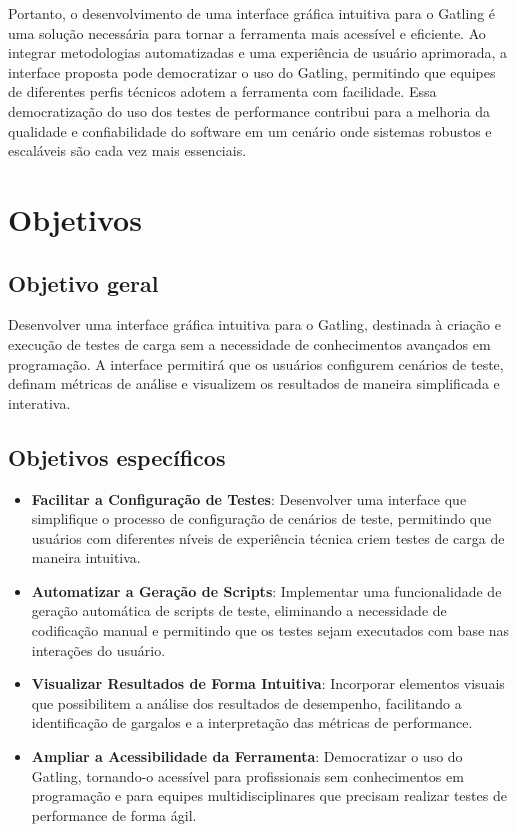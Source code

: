 \documentclass[
	12pt,
	openright,
	twoside,
	a4paper,
	english,
	brazil
	]{abntex2}
\begin{document}
Portanto, o desenvolvimento de uma interface gráfica intuitiva para o Gatling é uma solução necessária para tornar a ferramenta mais acessível e eficiente. Ao integrar metodologias automatizadas e uma experiência de usuário aprimorada, a interface proposta pode democratizar o uso do Gatling, permitindo que equipes de diferentes perfis técnicos adotem a ferramenta com facilidade. Essa democratização do uso dos testes de performance contribui para a melhoria da qualidade e confiabilidade do software em um cenário onde sistemas robustos e escaláveis são cada vez mais essenciais.



\section{Objetivos}
\subsection{Objetivo geral}

Desenvolver uma interface gráfica intuitiva para o Gatling, destinada à criação e execução de testes de carga sem a necessidade de conhecimentos avançados em programação. A interface permitirá que os usuários configurem cenários de teste, definam métricas de análise e visualizem os resultados de maneira simplificada e interativa.

\subsection{Objetivos específicos}
\begin{itemize}
  \item \textbf{Facilitar a Configuração de Testes}: Desenvolver uma interface que simplifique o processo de configuração de cenários de teste, permitindo que usuários com diferentes níveis de experiência técnica criem testes de carga de maneira intuitiva.
  \item \textbf{Automatizar a Geração de Scripts}: Implementar uma funcionalidade de geração automática de scripts de teste, eliminando a necessidade de codificação manual e permitindo que os testes sejam executados com base nas interações do usuário.
  \item \textbf{Visualizar Resultados de Forma Intuitiva}: Incorporar elementos visuais que possibilitem a análise dos resultados de desempenho, facilitando a identificação de gargalos e a interpretação das métricas de performance.
  \item \textbf{Ampliar a Acessibilidade da Ferramenta}: Democratizar o uso do Gatling, tornando-o acessível para profissionais sem conhecimentos em programação e para equipes multidisciplinares que precisam realizar testes de performance de forma ágil.
\end{itemize}
\end{document}
